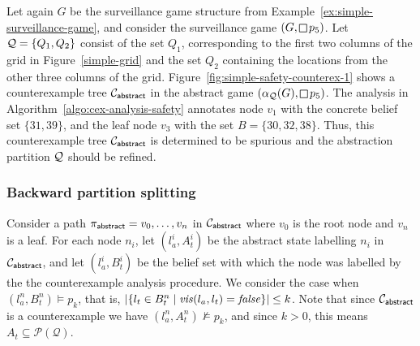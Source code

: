 \begin{example}\label{ex:simple-safety-unconcretizable}
Let again $G$ be the surveillance game structure from Example~\ref{ex:simple-surveillance-game}, and consider the surveillance game $(G,\LTLglobally p_5)$. 
Let $\mathcal{Q} = \{Q_1,Q_2\}$ consist of the set $Q_1$, corresponding to the first two columns of the grid in Figure~\ref{simple-grid} and the set $Q_2$ containing the locations from the other three columns of the grid. Figure~\ref{fig:simple-safety-counterex-1} shows a counterexample tree $\mathcal{C}_{\mathsf{abstract}}$ in the abstract game $(\alpha_\part(G),\LTLglobally p_5)$. The analysis in Algorithm~\ref{algo:cex-analysis-safety} annotates node $v_1$ with the concrete belief set $\{31,39\}$, and the leaf node $v_3$ with the set $B = \{30,32,38\}$. Thus, this counterexample tree $\mathcal{C}_{\mathsf{abstract}}$ is determined to be spurious and the abstraction partition $\mathcal{Q}$ should be refined.
\end{example}

\subsubsection{Backward partition splitting}
Consider a path $\pi_{\mathsf{abstract}} = v_0,\ldots, v_n$ in $\mathcal{C}_{\mathsf{abstract}}$ where $v_0$ is the root node and $v_n$ is a leaf. For each node $n_i$, let $(l_a^i,A_t^i) $ be the abstract state labelling $n_i$ in $\mathcal{C}_{\mathsf{abstract}}$, and let $(l_a^i,B_t^i)$ be the  belief set with which the node was labelled by the the counterexample analysis procedure. We consider the case when $(l_a^n,B_t^n) \models p_k$, that is, $|\{l_t \in B_t^n \mid \mathit{vis}(l_a,l_t) = \mathit{false}\}| \leq k$.
Note that since $\mathcal{C}_{\mathsf{abstract}}$ is a counterexample we have $(l_a^n,A_t^n) \not \models p_k$, and since $k>0$, this means $A_t \subseteq \mathcal{P}(\mathcal Q)$.


